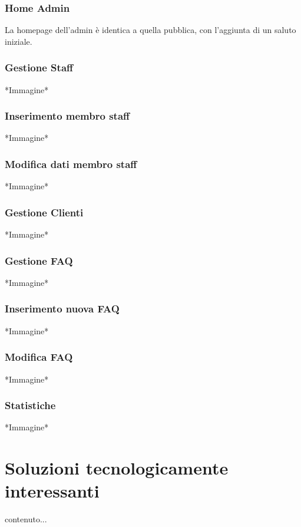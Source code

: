 \documentclass[12pt,a4paperS]{report}
\begin{document}
\begin{normalsize}
			\subsection{Home Admin}
				La homepage dell'admin è identica a quella pubblica, con l'aggiunta di un saluto iniziale.
			
			\subsection{Gestione Staff}
				*Immagine*
			
			\subsection{Inserimento membro staff}
				*Immagine*
			
			\subsection{Modifica dati membro staff}
				*Immagine*
			
			\subsection{Gestione Clienti}
				*Immagine*
		
			\subsection{Gestione FAQ}
				*Immagine*
			
			\subsection{Inserimento nuova FAQ}
				*Immagine*
			
			\subsection{Modifica FAQ}
				*Immagine*
			
			\subsection{Statistiche}
				*Immagine*
			
	\end{normalsize}
	
	\hypertarget{soluzioni}{\chapter{Soluzioni tecnologicamente interessanti}}
	\label{soluzioni}
	\begin{normalsize}
		contenuto...
	\end{normalsize}
\end{document}
